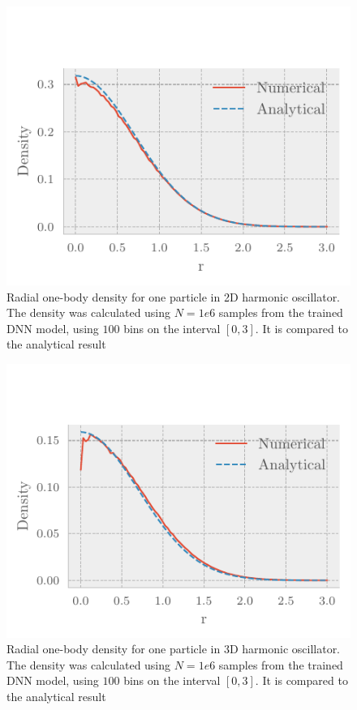 \begin{figure}[H]
	\includegraphics[]{figures/one_part_2D_dens.pdf}
	\caption{Radial one-body density for one particle in 2D harmonic oscillator. The density was calculated using $N=1e6$ samples from the trained DNN model, using $100$ bins on the interval $[0,3]$. It is compared to the analytical result}
	\label{fig:one_part_2D_dens}
\end{figure}

\begin{figure}[H]
	\includegraphics[]{figures/one_part_3D_dens.pdf}
	\caption{Radial one-body density for one particle in 3D harmonic oscillator. The density was calculated using $N=1e6$ samples from the trained DNN model, using $100$ bins on the interval $[0,3]$. It is compared to the analytical result}
	\label{fig:one_part_3D_dens}
\end{figure}

